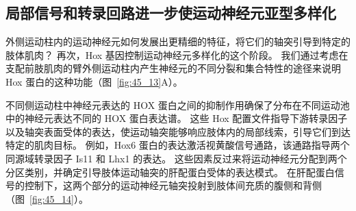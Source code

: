 \subsection{局部信号和转录回路进一步使运动神经元亚型多样化}

外侧运动柱内的运动神经元如何发展出更精细的特征，将它们的轴突引导到特定的肢体肌肉？
再次，Hox 基因控制运动神经元多样化的这个阶段。
我们通过考虑在支配前肢肌肉的臂外侧运动柱内产生神经元的不同分裂和集合特性的途径来说明 Hox 蛋白的这种功能（图~\ref{fig:45_13}A）。


不同侧运动柱中神经元表达的 HOX 蛋白之间的抑制作用确保了分布在不同运动池中的神经元表达不同的 HOX 蛋白表达谱。
这些 Hox 配置文件指导下游转录因子以及轴突表面受体的表达，使运动轴突能够响应肢体内的局部线索，引导它们到达特定的肌肉目标。
例如，Hox6 蛋白的表达激活视黄酸信号通路，该通路指导两个同源域转录因子 Is11 和 Lhx1 的表达。
这些因素反过来将运动神经元分配到两个分区类别，并确定引导肢体运动轴突的肝配蛋白受体的表达模式。
在肝配蛋白信号的控制下，这两个部分的运动神经元轴突投射到肢体间充质的腹侧和背侧（图~\ref{fig:45_14}）。


